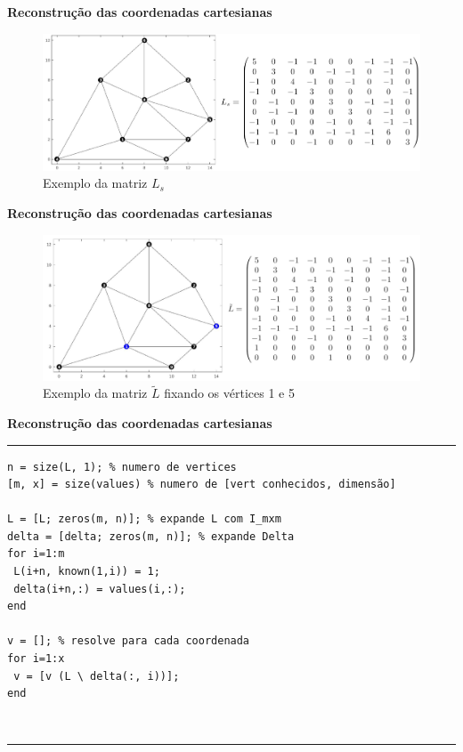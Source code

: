 \begin{frame}{{\bf \color{blue} Reconstrução das coordenadas cartesianas}}
\begin{figure}
	\includegraphics[width=1\linewidth]{imagens/grafo_lapl.png}
	\caption{Exemplo da matriz $L_s$}
\end{figure}
\end{frame}

\begin{frame}{{\bf \color{blue} Reconstrução das coordenadas cartesianas}}
	\begin{figure}
		\includegraphics[width=1\linewidth]{imagens/grafo_lapl_tilde.png}
		\caption{Exemplo da matriz $\tilde{L}$ fixando os vértices 1 e 5}
	\end{figure}
\end{frame}

\begin{frame}[fragile]{{\bf \color{blue} Reconstrução das coordenadas cartesianas}}
\begin{Codigo}
\noindent\rule{11.2cm}{1.pt}
\vspace{-0.2cm}
\begin{verbatim}
n = size(L, 1); % numero de vertices
[m, x] = size(values) % numero de [vert conhecidos, dimensão]

L = [L; zeros(m, n)]; % expande L com I_mxm
delta = [delta; zeros(m, n)]; % expande Delta
for i=1:m
 L(i+n, known(1,i)) = 1;
 delta(i+n,:) = values(i,:);
end

v = []; % resolve para cada coordenada
for i=1:x
 v = [v (L \ delta(:, i))];
end
\end{verbatim}\\
\vspace{-0.5cm}
\noindent\rule{11.2cm}{1.pt}\\
\end{Codigo}
\end{frame}


